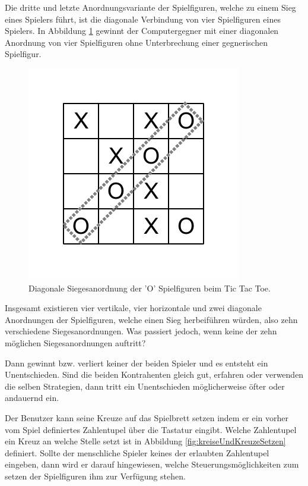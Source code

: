 Die dritte und letzte Anordnungsvariante der Spielfiguren, welche zu einem Sieg eines Spielers führt, ist die diagonale Verbindung von vier Spielfiguren eines Spielers. In Abbildung \ref{fig:tttDiagonalerSieg} gewinnt der Computergegner mit einer diagonalen Anordnung von vier Spielfiguren ohne Unterbrechung einer gegnerischen Spielfigur.

\begin{figure}[!htbp]
  \centering
  \includegraphics[scale = 1]{inhalt/abbildungen/diagonaler_sieg.pdf}
  \caption{Diagonale Siegesanordnung der 'O' Spielfiguren beim Tic Tac Toe.}
  \label{fig:tttDiagonalerSieg}
\end{figure}

Insgesamt existieren vier vertikale, vier horizontale und zwei diagonale Anordnungen der Spielfiguren, welche einen Sieg herbeiführen würden, also zehn verschiedene Siegesanordnungen. Was passiert jedoch, wenn keine der zehn möglichen Siegesanordnungen auftritt?

Dann gewinnt bzw. verliert keiner der beiden Spieler und es entsteht ein Unentschieden. Sind die beiden Kontrahenten gleich gut, erfahren oder verwenden die selben Strategien, dann tritt ein Unentschieden möglicherweise öfter oder andauernd ein.


Der Benutzer kann seine Kreuze auf das Spielbrett setzen indem er ein vorher vom Spiel definiertes Zahlentupel über die Tastatur eingibt. Welche Zahlentupel ein Kreuz an welche Stelle setzt ist in Abbildung \ref{fig:kreiseUndKreuzeSetzen} definiert. Sollte der menschliche Spieler keines der erlaubten Zahlentupel eingeben, dann wird er darauf hingewiesen, welche Steuerungsmöglichkeiten zum setzen der Spielfiguren ihm zur Verfügung stehen.


